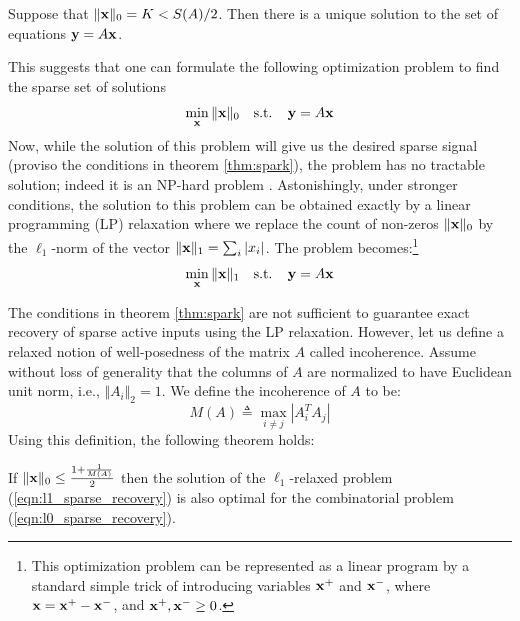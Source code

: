 \begin{theorem}
\label{thm:spark}
Suppose that $\Vert \mathbf{x} \Vert_0 = K < S(A) / 2$. Then there is a unique solution to the
set of equations $\mathbf{y} = A \mathbf{x}$.
\end{theorem}

This suggests that one can formulate the following optimization problem to find the sparse set of solutions
\begin{equation}
\label{eqn:l0_sparse_recovery}
\min_{\mathbf{x}} \Vert \mathbf{x} \Vert_0  ~~\mbox{ s.t. }~~ \mathbf{y} = A \mathbf{x}
\end{equation}
Now, while the solution of this problem will give us the desired sparse signal (proviso the conditions in
theorem \ref{thm:spark}), the problem has no tractable solution; indeed it is an NP-hard problem \cite{natarajan1995sparse_recovery_complexity}. Astonishingly, under stronger conditions, the solution to this problem can be obtained exactly by a linear
programming (LP) relaxation where we replace the count of non-zeros $\Vert \mathbf{x} \Vert_0$  by the $\ell_1$-norm
of the vector $\Vert \mathbf{x} \Vert_1 = \sum_i | x_i|$. The problem becomes:\footnote{This optimization problem can be represented as a linear
program by a standard simple trick of introducing variables $\mathbf{x}^+$ and $\mathbf{x}^-$, where $\mathbf{x} = \mathbf{x}^+ - \mathbf{x}^-$,
and $\mathbf{x}^+, \mathbf{x}^- \ge 0$. }
\begin{equation}
\label{eqn:l1_sparse_recovery}
\min_{\mathbf{x}} \Vert \mathbf{x} \Vert_1  ~~\mbox{ s.t. }~~ \mathbf{y} = A \mathbf{x}
\end{equation}

The conditions in theorem \ref{thm:spark} are not sufficient to guarantee exact recovery of
sparse active inputs using the LP relaxation. However, let us define a relaxed notion of
well-posedness of the matrix $A$ called incoherence. Assume without loss of generality that
the columns of $A$ are normalized to have Euclidean unit norm, i.e., $\Vert A_i \Vert_2 = 1$.  We define the incoherence of $A$ to be:
\begin{equation}
M(A) \triangleq \max_{i \ne j} | A_i^T A_j |
\end{equation}
Using this definition, the following theorem holds:
\begin{theorem}
\label{thm:incoherence}
If $\Vert \mathbf{x} \Vert_0 \le \frac{ 1 + \frac{1}{M(A)}} {2}$ then the solution of the $\ell_1$-relaxed
problem (\ref{eqn:l1_sparse_recovery}) is also optimal for the combinatorial problem
(\ref{eqn:l0_sparse_recovery}).
\end{theorem}

